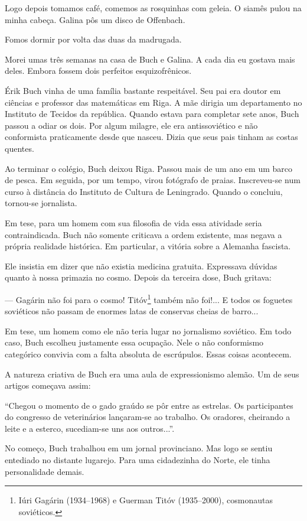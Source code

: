 Logo depois tomamos café, comemos as rosquinhas com geleia. O siamês
pulou na minha cabeça. Galina pôs um disco de Offenbach.

Fomos dormir por volta das duas da madrugada.

Morei umas três semanas na casa de Buch e Galina. A cada dia eu gostava
mais deles. Embora fossem dois perfeitos esquizofrênicos.

Érik Buch vinha de uma família bastante respeitável. Seu pai era doutor
em ciências e professor das matemáticas em Riga. A mãe dirigia um
departamento no Instituto de Tecidos da república. Quando estava para
completar sete anos, Buch passou a odiar os dois. Por algum milagre, ele
era antissoviético e não conformista praticamente desde que nasceu.
Dizia que seus pais tinham as costas quentes.

Ao terminar o colégio, Buch deixou Riga. Passou mais de um ano em um
barco de pesca. Em seguida, por um tempo, virou fotógrafo de praias.
Inscreveu-se num curso à distância do Instituto de Cultura de
Leningrado. Quando o concluiu, tornou-se jornalista.

Em tese, para um homem com sua filosofia de vida essa atividade seria
contraindicada. Buch não somente criticava a ordem existente, mas negava
a própria realidade histórica. Em particular, a vitória sobre a Alemanha
fascista.

Ele insistia em dizer que não existia medicina gratuita. Expressava
dúvidas quanto à nossa primazia no cosmo. Depois da terceira dose, Buch
gritava:

--- Gagárin não foi para o cosmo! Titóv\footnote{Iúri Gagárin
  (1934--1968) e Guerman Titóv (1935--2000), cosmonautas soviéticos.}
também não foi!... E todos os foguetes soviéticos não passam de enormes
latas de conservas cheias de barro...

Em tese, um homem como ele não teria lugar no jornalismo soviético. Em
todo caso, Buch escolheu justamente essa ocupação. Nele o não
conformismo categórico convivia com a falta absoluta de escrúpulos.
Essas coisas acontecem.

A natureza criativa de Buch era uma aula de expressionismo alemão. Um de
seus artigos começava assim:

``Chegou o momento de o gado graúdo se pôr entre as estrelas. Os
participantes do congresso de veterinários lançaram-se ao trabalho. Os
oradores, cheirando a leite e a esterco, sucediam-se uns aos
outros...''.

No começo, Buch trabalhou em um jornal provinciano. Mas logo se sentiu
entediado no distante lugarejo. Para uma cidadezinha do Norte, ele tinha
personalidade demais.

